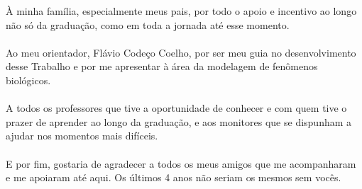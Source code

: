  
\begin{agradecimentos}
    À minha família, especialmente meus pais, por todo o apoio e 
    incentivo ao longo não só da graduação, como em toda a jornada até esse momento. 
    \\\\
    Ao meu orientador, Flávio Codeço Coelho, por ser meu guia no
    desenvolvimento desse Trabalho e por me apresentar à área da modelagem de fenômenos biológicos.   
    \\\\
    A todos os professores que tive a oportunidade de conhecer e com quem tive o prazer de aprender 
    ao longo da graduação, e aos monitores que se dispunham a ajudar nos momentos mais difíceis.
    \\\\
    E por fim, gostaria de agradecer a todos os meus amigos que me acompanharam e me apoiaram até aqui. 
    Os últimos 4 anos não seriam os mesmos sem vocês.
\end{agradecimentos}


